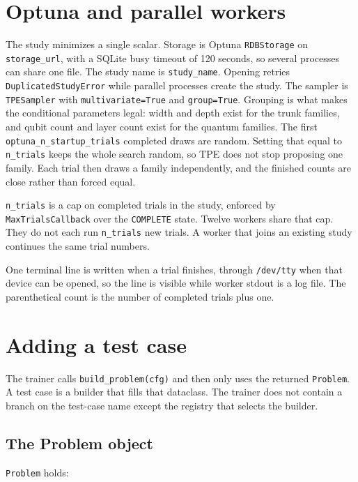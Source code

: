 \documentclass[11pt]{article}
\begin{document}
\section{Optuna and parallel workers}

The study minimizes a single scalar.
Storage is Optuna \texttt{RDBStorage} on \texttt{storage\_url}, with a SQLite busy timeout of 120 seconds, so several processes can share one file.
The study name is \texttt{study\_name}.
Opening retries \texttt{DuplicatedStudyError} while parallel processes create the study.
The sampler is \texttt{TPESampler} with \texttt{multivariate=True} and \texttt{group=True}.
Grouping is what makes the conditional parameters legal: width and depth exist for the trunk families, and qubit count and layer count exist for the quantum families.
The first \texttt{optuna\_n\_startup\_trials} completed draws are random.
Setting that equal to \texttt{n\_trials} keeps the whole search random, so TPE does not stop proposing one family.
Each trial then draws a family independently, and the finished counts are close rather than forced equal.

\texttt{n\_trials} is a cap on completed trials in the study, enforced by \texttt{MaxTrialsCallback} over the \texttt{COMPLETE} state.
Twelve workers share that cap.
They do not each run \texttt{n\_trials} new trials.
A worker that joins an existing study continues the same trial numbers.

One terminal line is written when a trial finishes, through \texttt{/dev/tty} when that device can be opened, so the line is visible while worker stdout is a log file.
The parenthetical count is the number of completed trials plus one.

\section{Adding a test case}

The trainer calls \texttt{build\_problem(cfg)} and then only uses the returned \texttt{Problem}.
A test case is a builder that fills that dataclass.
The trainer does not contain a branch on the test-case name except the registry that selects the builder.

\subsection{The Problem object}

\texttt{Problem} holds:
\end{document}
